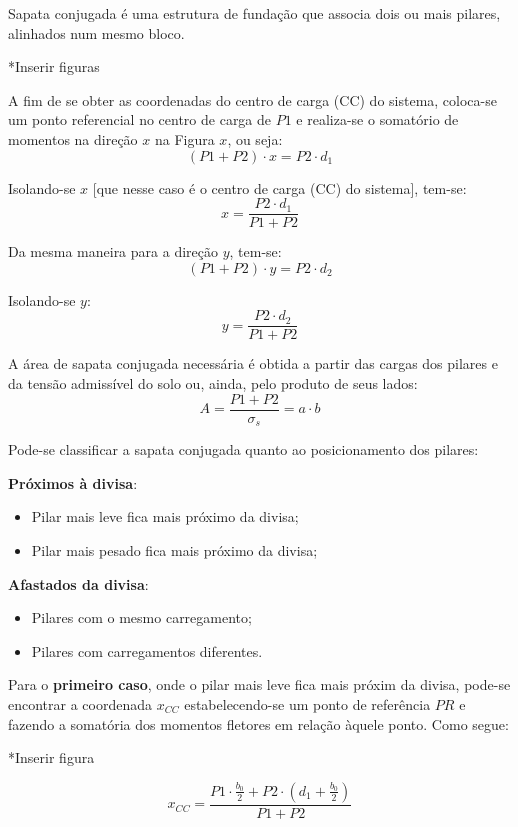 Sapata conjugada é uma estrutura de fundação que associa dois ou mais pilares, alinhados num mesmo bloco.

*Inserir figuras

A fim de se obter as coordenadas do centro de carga (CC) do sistema, coloca-se um ponto referencial no centro de carga de $P1$ e realiza-se o somatório de momentos na direção $x$ na Figura $x$, ou seja:
$$(P1+P2)\cdot x=P2\cdot d_1$$

Isolando-se $x$ [que nesse caso é o centro de carga (CC) do sistema], tem-se:
\begin{equation}x=\frac{P2\cdot d_1}{P1+P2}\end{equation}

Da mesma maneira para a direção $y$, tem-se:
$$(P1+P2)\cdot y=P2\cdot d_2$$

Isolando-se $y$:
\begin{equation}y=\frac{P2\cdot d_2}{P1+P2}\end{equation}

A área de sapata conjugada necessária é obtida a partir das cargas dos pilares e da tensão admissível do solo ou, ainda, pelo produto de seus lados:
\begin{equation}A=\frac{P1+P2}{\sigma_s}=a\cdot b\end{equation}

Pode-se classificar a sapata conjugada quanto ao posicionamento dos pilares:

\textbf{Próximos à divisa}:
\begin{itemize}
	\item Pilar mais leve fica mais próximo da divisa;
	\item Pilar mais pesado fica mais próximo da divisa;
\end{itemize}

\textbf{Afastados da divisa}:
\begin{itemize}
	\item Pilares com o mesmo carregamento;
	\item Pilares com carregamentos diferentes.
\end{itemize}

Para o \textbf{primeiro caso}, onde o pilar mais leve fica mais próxim da divisa, pode-se encontrar a coordenada $x_{CC}$ estabelecendo-se um ponto de referência $PR$ e fazendo a somatória dos momentos fletores em relação àquele ponto. Como segue:

*Inserir figura

$$x_{CC}=\frac{P1\cdot\displaystyle\frac{b_0}{2}+P2\cdot\left(d_1+\displaystyle\frac{b_0}{2}\right)}{P1+P2}$$

